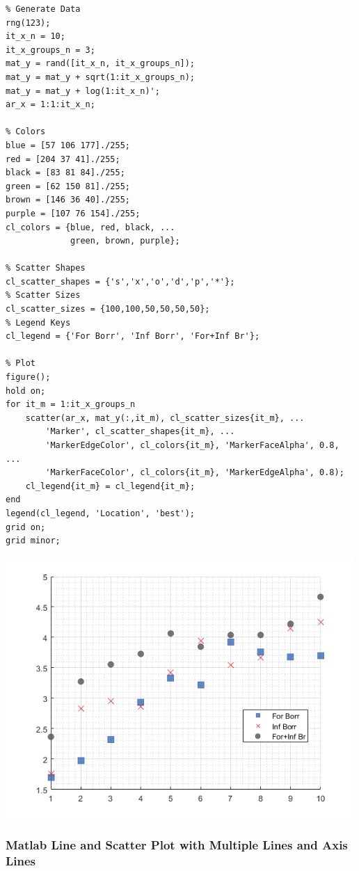 \documentclass[
]{book}
\begin{document}
\begin{verbatim}
% Generate Data
rng(123);
it_x_n = 10;
it_x_groups_n = 3;
mat_y = rand([it_x_n, it_x_groups_n]);
mat_y = mat_y + sqrt(1:it_x_groups_n);
mat_y = mat_y + log(1:it_x_n)';
ar_x = 1:1:it_x_n;

% Colors
blue = [57 106 177]./255;
red = [204 37 41]./255;
black = [83 81 84]./255;
green = [62 150 81]./255;
brown = [146 36 40]./255;
purple = [107 76 154]./255;
cl_colors = {blue, red, black, ...
             green, brown, purple};

% Scatter Shapes
cl_scatter_shapes = {'s','x','o','d','p','*'};
% Scatter Sizes
cl_scatter_sizes = {100,100,50,50,50,50};
% Legend Keys
cl_legend = {'For Borr', 'Inf Borr', 'For+Inf Br'};

% Plot
figure();
hold on;
for it_m = 1:it_x_groups_n
    scatter(ar_x, mat_y(:,it_m), cl_scatter_sizes{it_m}, ...
        'Marker', cl_scatter_shapes{it_m}, ...
        'MarkerEdgeColor', cl_colors{it_m}, 'MarkerFaceAlpha', 0.8, ...
        'MarkerFaceColor', cl_colors{it_m}, 'MarkerEdgeAlpha', 0.8);
    cl_legend{it_m} = cl_legend{it_m};
end
legend(cl_legend, 'Location', 'best');
grid on; 
grid minor;
\end{verbatim}

\includegraphics[width=5.20833in,height=\textheight]{img/fs_scatter_images/figure_1.png}

\vspace{1em}

\hypertarget{matlab-line-and-scatter-plot-with-multiple-lines-and-axis-lines}{%
\subsubsection{Matlab Line and Scatter Plot with Multiple Lines and Axis Lines}\label{matlab-line-and-scatter-plot-with-multiple-lines-and-axis-lines}}
\end{document}
